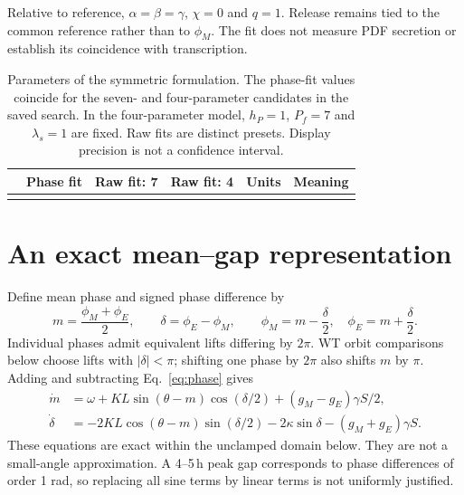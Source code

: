 \documentclass[11pt,letterpaper]{article}
\begin{document}
Relative to reference, $\alpha=\beta=\gamma$, $\chi=0$ and $q=1$.
Release remains tied to the common reference rather than to
$\phi_M$. The fit does not measure PDF secretion or establish its
coincidence with transcription.

\begin{table}[!htbp]
\centering\scriptsize
\setlength{\tabcolsep}{3.5pt}
\renewcommand{\arraystretch}{1.15}
\begin{tabularx}{\textwidth}{lrrrlY}
\toprule
 & Phase fit & Raw fit: 7 & Raw fit: 4 & Units & Meaning\\
\midrule
\\
\bottomrule
\end{tabularx}
\caption{Parameters of the symmetric formulation. The phase-fit values
coincide for the seven- and four-parameter candidates in the saved search.
In the four-parameter model, $h_P=1$, $P_f=7$ and $\lambda_s=1$ are fixed.
Raw fits are distinct presets. Display precision is not a confidence interval.}
\label{tab:params}
\end{table}

\clearpage
\section{An exact mean--gap representation}
\label{sec:mean}

Define mean phase and signed phase difference by
\begin{equation}
m=\frac{\phi_M+\phi_E}{2},\qquad
\delta=\phi_E-\phi_M,\qquad
\phi_M=m-\frac{\delta}{2},\quad \phi_E=m+\frac{\delta}{2}.
\end{equation}
Individual phases admit equivalent lifts differing by $2\pi$.
WT orbit comparisons below choose lifts with $|\delta|<\pi$;
shifting one phase by $2\pi$ also shifts $m$ by $\pi$.
Adding and subtracting Eq.~\eqref{eq:phase} gives
\begin{equation}
\boxed{\begin{aligned}
\dot m&=\omega+KL\sin(\theta-m)\cos(\delta/2)
                 +(g_M-g_E)\gamma S/2,\\
\dot\delta&=-2KL\cos(\theta-m)\sin(\delta/2)
                 -2\kappa\sin\delta-(g_M+g_E)\gamma S.
\end{aligned}}\label{eq:mean}
\end{equation}
These equations are exact within the unclamped domain below.
They are not a small-angle approximation. A 4--5\,h peak gap corresponds
to phase differences of order 1 rad, so replacing all sine terms by
linear terms is not uniformly justified.
\end{document}
